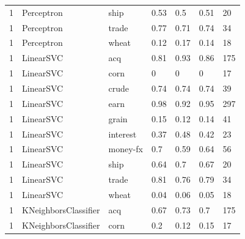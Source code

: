 \documentclass{article}
\begin{document}
\begin{table}[h]
\begin{tabular}{lllllll}
1             & Perceptron             & ship            & 0.53               & 0.5             & 0.51              & 20               \\
1             & Perceptron             & trade           & 0.77               & 0.71            & 0.74              & 34               \\
1             & Perceptron             & wheat           & 0.12               & 0.17            & 0.14              & 18               \\
1             & LinearSVC              & acq             & 0.81               & 0.93            & 0.86              & 175              \\
1             & LinearSVC              & corn            & 0                  & 0               & 0                 & 17               \\
1             & LinearSVC              & crude           & 0.74               & 0.74            & 0.74              & 39               \\
1             & LinearSVC              & earn            & 0.98               & 0.92            & 0.95              & 297              \\
1             & LinearSVC              & grain           & 0.15               & 0.12            & 0.14              & 41               \\
1             & LinearSVC              & interest        & 0.37               & 0.48            & 0.42              & 23               \\
1             & LinearSVC              & money-fx        & 0.7                & 0.59            & 0.64              & 56               \\
1             & LinearSVC              & ship            & 0.64               & 0.7             & 0.67              & 20               \\
1             & LinearSVC              & trade           & 0.81               & 0.76            & 0.79              & 34               \\
1             & LinearSVC              & wheat           & 0.04               & 0.06            & 0.05              & 18               \\
1             & KNeighborsClassifier   & acq             & 0.67               & 0.73            & 0.7               & 175              \\
1             & KNeighborsClassifier   & corn            & 0.2                & 0.12            & 0.15              & 17               \\

\end{tabular}
\end{table}
\end{document}
